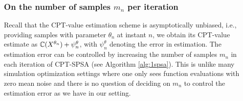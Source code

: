 
\subsubsection*{On the number of samples $m_n$ per iteration}
Recall that the CPT-value estimation scheme is asymptotically unbiased, i.e., providing samples with parameter $\theta_n$ at instant $n$, we obtain its CPT-value estimate as $\mathbb{C}(X^{\theta_n}) + \psi_n^\theta$, with $\psi_n^\theta$ denoting the error in estimation. The estimation error can be controlled by increasing the number of samples $m_n$ in each iteration of CPT-SPSA (see Algorithm \ref{alg:1spsa}). This is unlike many simulation optimization settings where one only sees function evaluations with zero mean noise and there is no question of deciding on $m_n$ to control the estimation error as we have in our setting.

